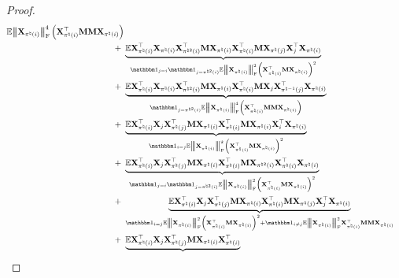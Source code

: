\documentclass[11pt]{article}
\begin{document}
\begin{proof}
\begin{align}
{\Expc \Fnorm{\bX_{\pi^{\natural}(i)}}^4
\bracket{\bX_{\pi^{\natural}(i)}^{\rmt}\bM\bM \bX_{\pi^{\natural}(i)}}
} \notag \\
+~&
\underbrace{
\Expc \bX_{\pi^{\natural}(i)}^{\rmt}
\bX_{\pi^{\natural}(i)}\bX_{\pi^{\natural 2}(i)}^{\rmt}
\bM
\bX_{\pi^{\natural}(i)} \bX_{\pi^{\natural}(i)}^{\rmt}
\bM
\bX_{\pi^{\natural}(j)}\bX_{j}^{\rmt}
\bX_{\pi^{\natural}(i)}}_{
\Ind_{j = i}\Ind_{j = \pi^{\natural 2}(i)}
\Expc \Fnorm{\bX_{\pi^{\natural}(i)}}^2 \bracket{\bX_{\pi^{\natural}(i)}^{\rmt}\bM \bX_{\pi^{\natural}(i)} }^2
} \notag \\
+~& \underbrace{
\Expc \bX_{\pi^{\natural}(i)}^{\rmt} %
\bX_{\pi^{\natural}(i)}\bX_{\pi^{\natural 2}(i)}^{\rmt}
\bM
\bX_{\pi^{\natural}(i)} \bX_{\pi^{\natural}(i)}^{\rmt}
\bM
\bX_{j}\bX_{\pi^{\natural -1}(j)}^{\rmt}
\bX_{\pi^{\natural}(i)}}_{
\Ind_{j = \pi^{\natural 2}(i)}
\Expc \Fnorm{\bX_{\pi^{\natural}(i)}}^4
\bracket{\bX_{\pi^{\natural}(i)}^{\rmt}\bM\bM \bX_{\pi^{\natural}(i)}}
} \notag \\
+~&
\underbrace{
\Expc \bX_{\pi^{\natural}(i)}^{\rmt}
\bX_{j}\bX_{\pi^{\natural}(j)}^{\rmt}
\bM
\bX_{\pi^{\natural}(i)} \bX_{\pi^{\natural}(i)}^{\rmt}
\bM
\bX_{\pi^{\natural}(i)}\bX_{i}^{\rmt}
\bX_{\pi^{\natural}(i)}}_{
\Ind_{i = j}
\Expc \Fnorm{\bX_{\pi^{\natural}(i)}}^2 \bracket{\bX_{\pi^{\natural}(i)}^{\rmt}\bM \bX_{\pi^{\natural}(i)} }^2
} \notag \\
+~&
\underbrace{
\Expc \bX_{\pi^{\natural}(i)}^{\rmt}
 \bX_{j}\bX_{\pi^{\natural}(j)}^{\rmt}
\bM
\bX_{\pi^{\natural}(i)} \bX_{\pi^{\natural}(i)}^{\rmt}
\bM
\bX_{\pi^{\natural 2}(i)}\bX_{\pi^{\natural}(i)}^{\rmt}
\bX_{\pi^{\natural}(i)}}_{
\Ind_{j = i} \Ind_{j = \pi^{\natural 2}(i)}
\Expc \Fnorm{\bX_{\pi^{\natural}(i)}}^2 \bracket{\bX_{\pi^{\natural}(i)}^{\rmt}\bM \bX_{\pi^{\natural}(i)} }^2
} \notag \\
+~&
\underbrace{\Expc \bX_{\pi^{\natural}(i)}^{\rmt}
\bX_{j}\bX_{\pi^{\natural}(j)}^{\rmt}
\bM
\bX_{\pi^{\natural}(i)} \bX_{\pi^{\natural}(i)}^{\rmt}
\bM
\bX_{\pi^{\natural}(j)}\bX_{j}^{\rmt}
\bX_{\pi^{\natural}(i)}}_{
\Ind_{i = j} \Expc \Fnorm{\bX_{\pi^{\natural}(i)}}^2 \bracket{\bX_{\pi^{\natural}(i)}^{\rmt}\bM \bX_{\pi^{\natural}(i)} }^2
+ \Ind_{i\neq j}
\Expc \Fnorm{\bX_{\pi^{\natural}(i)}}^2
\bX_{\pi^{\natural}(i)}^{\rmt}\bM \bM \bX_{\pi^{\natural}(i)}
} \notag \\
+~&
\underbrace{\Expc \bX_{\pi^{\natural}(i)}^{\rmt}
 \bX_{j}\bX_{\pi^{\natural}(j)}^{\rmt}
\bM
\bX_{\pi^{\natural}(i)} \bX_{\pi^{\natural}(i)}^{\rmt}
}
\end{align}
\end{proof}
\end{document}
